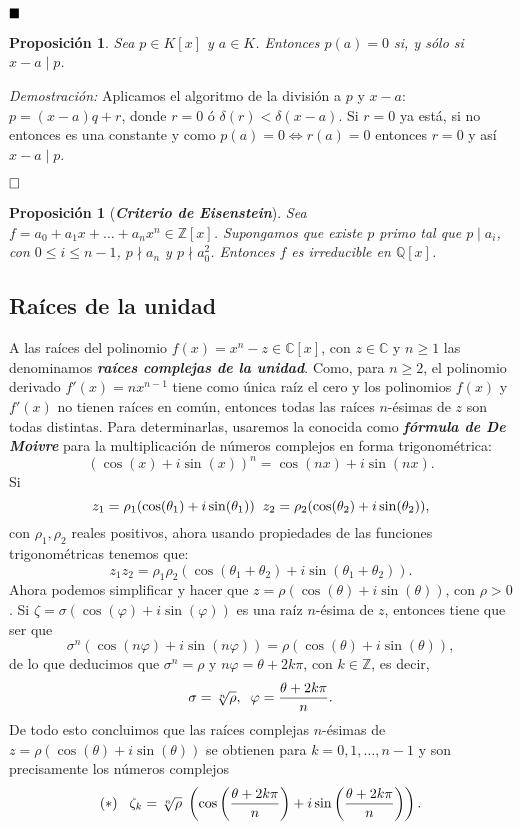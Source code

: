 \documentclass[12pt]{article}
\newtheorem{proposition}[theorem]{Proposición}
\begin{document}
$\hfill \blacksquare$

\begin{proposition}\label{eq:ac2} Sea $p \in K[x]$ y $a \in K$. Entonces $p(a) = 0$ si, y sólo si $x-a \mid p$.
\end{proposition}
\emph{Demostración: } Aplicamos el algoritmo de la división a $p$ y $x-a$: $p=(x-a)q + r$, donde $r = 0$ ó $\delta(r) < \delta(x-a)$. Si $r= 0$ ya está, si no entonces es una constante y como $p(a) = 0 \Leftrightarrow r(a)= 0$ entonces $r = 0$ y así $x-a \mid p$.

$\hfill \square$

\begin{proposition}[\textbf{\textit{Criterio de Eisenstein}}] Sea $f= a_{0} + a_{1}x + \ldots + a_{n}x^{n} \in \mathbb{Z}[x]$. Supongamos que existe $p$ primo tal que $p \mid a_{i}$, con $0 \leq i \leq n-1$, $p \nmid a_{n}$ y $p \nmid a_{0}^{2}$. Entonces $f$ es irreducible en $\mathbb{Q}[x]$.
\end{proposition} 

\subsection{Raíces de la unidad} \label{eq:raicesUnidad}

A las raíces del polinomio $f(x) = x^{n}-z \in \mathbb{C}[x]$, con $z \in \mathbb{C}$ y $n \geq 1$ las denominamos \textbf{\textit{raíces complejas de la unidad}}. Como, para $n \geq 2$, el polinomio derivado $f'(x) = nx^{n-1}$ tiene como única raíz el cero y los polinomios $f(x)$ y $f'(x)$ no tienen raíces en común, entonces todas las raíces $n$-ésimas de $z$ son todas distintas. Para determinarlas, usaremos la conocida como \textbf{\textit{fórmula de De Moivre}} para la multiplicación de números complejos en forma trigonométrica: $$(\cos(x) + i\sin(x))^{n} = \cos(nx) + i\sin(nx).$$ Si $$z_{1} = \rho_{1}(\cos (\theta_{1}) +i\sin (\theta_{1})) \hspace{0.2cm}z_{2} = \rho_{2}(\cos (\theta_{2}) +i\sin (\theta_{2})),$$ con $\rho_{1}, \rho_{2}$ reales positivos, ahora usando propiedades de las funciones trigonométricas tenemos que:
$$z_{1}z_{2} = \rho_{1}\rho_{2}(\cos(\theta_{1} + \theta_{2}) + i \sin(\theta_{1} + \theta_{2})).$$ Ahora podemos simplificar y hacer que $z = \rho (\cos(\theta) + i\sin(\theta))$, con $\rho > 0$. Si $\zeta = \sigma (\cos(\varphi) + i\sin(\varphi)) $ es una raíz $n$-ésima de $z$, entonces tiene que ser que $$\sigma^{n}(\cos(n\varphi) + i\sin(n\varphi)) = \rho (\cos(\theta)+ i\sin(\theta)),$$ de lo que deducimos que $\sigma^{n} = \rho$ y $n\varphi = \theta +2k\pi$, con $k \in \mathbb{Z}$, es decir, $$\sigma = \sqrt[n]{\rho}, \hspace{0.2cm} \varphi = \dfrac{\theta+2k\pi}{n}.$$
De todo esto concluimos que las raíces complejas $n$-ésimas de $z = \rho(\cos(\theta) + i\sin(\theta))$ se obtienen para $k = 0, 1, \ldots, n-1$ y son precisamente los números complejos $$ (\ast) \hspace{0.3cm}\zeta_{k} = \sqrt[n]{\rho} \hspace{0.1cm}\left(\cos\left(\dfrac{\theta+2k\pi}{n}\right) + i\sin\left(\dfrac{\theta+2k\pi}{n}\right)\right).$$
\end{document}
